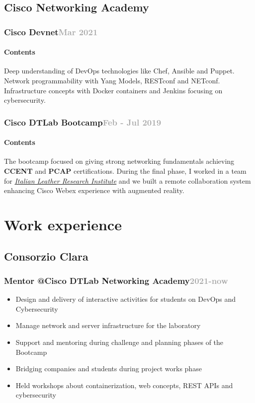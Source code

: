 \documentclass[11pt,a4paper]{article}
\begin{document}
  \subsection{Cisco Networking Academy}
  \subsubsection{Cisco Devnet\hfill \textcolor{darkgray}{\small{Mar 2021}}} 
  \paragraph{Contents}Deep understanding of DevOps technologies like Chef, Ansible and Puppet. Network programmability with Yang Models, RESTconf and NETconf. Infrastructure concepts with Docker containers and Jenkins focusing on cybersecurity.
  \subsubsection{Cisco DTLab Bootcamp\hfill \textcolor{darkgray}{\small{Feb -  Jul 2019}}} 
  \paragraph{Contents} The bootcamp focused on giving strong networking fundamentals achieving \textbf{CCENT} and \textbf{PCAP} certifications. During the final phase, I worked in a team for \href{https://ssip.it/}{\textit{Italian Leather Research Institute}} and we built a remote collaboration system enhancing Cisco Webex experience with augmented reality.

  \section*{Work experience}
  \subsection{Consorzio Clara}
    \subsubsection{Mentor @Cisco DTLab Networking Academy\hfill \textcolor{darkgray}{\small{2021-now}}}

  \begin{itemize}
    \item Design and delivery of interactive activities for students on DevOps and Cybersecurity
    \item Manage network and server infrastructure for the laboratory
    \item Support and mentoring during challenge and planning phases of the Bootcamp
    \item Bridging companies and students during project works phase
    \item Held workshops about containerization, web concepts, REST APIs and cybersecurity 
  \end{itemize}
  
\end{document}
